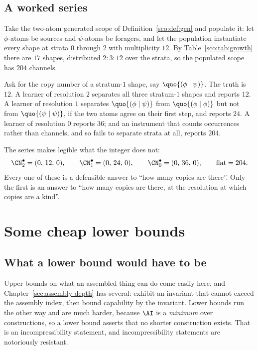 \subsection{A worked series}

Take the two-atom generated scope of Definition~\ref{sco:def:gen} and
populate it: let $\phi$-atoms be sources and $\psi$-atoms be foragers, and
let the population instantiate every shape at strata $0$ through $2$ with
multiplicity $12$. By Table~\ref{sco:tab:growth} there are $17$ shapes,
distributed $2 : 3 : 12$ over the strata, so the populated scope has $204$
channels.

Ask for the copy number of a stratum-$1$ shape, say $\quo{(\phi \mid
\psi)}$. The truth is $12$. A learner of resolution $2$ separates all
three stratum-$1$ shapes and reports $12$. A learner of resolution $1$
separates $\quo{(\phi\mid\psi)}$ from $\quo{(\phi\mid\phi)}$ but not from
$\quo{(\psi\mid\psi)}$, if the two atoms agree on their first step, and
reports $24$. A learner of resolution $0$ reports $36$; and an instrument
that counts occurrences rather than channels, and so fails to separate
strata at all, reports $204$.

The series makes legible what the integer does not:
\[
  \CN_2^{\bullet} = (0,\,12,\,0), \qquad
  \CN_1^{\bullet} = (0,\,24,\,0), \qquad
  \CN_0^{\bullet} = (0,\,36,\,0), \qquad
  \text{flat} = 204 .
\]
Every one of these is a defensible answer to ``how many copies are
there''. Only the first is an answer to ``how many copies are there, at
the resolution at which copies are a kind''.

\section{Some cheap lower bounds}
\label{scm:sec:floors}

\subsection{What a lower bound would have to be}

Upper bounds on what an assembled thing can do come easily here, and
Chapter~\ref{sec:assembly-depth} has several: exhibit an invariant that
cannot exceed the assembly index, then bound capability by the invariant.
Lower bounds run the other way and are much harder, because $\AI$ is a
\emph{minimum} over constructions, so a lower bound asserts that no
shorter construction exists. That is an incompressibility statement, and
incompressibility statements are notoriously resistant.

